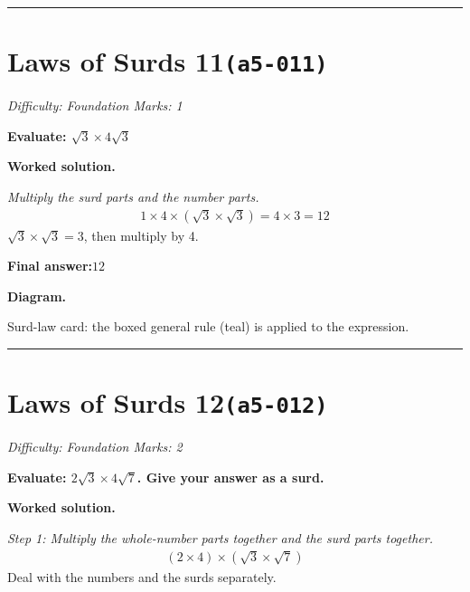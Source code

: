 \documentclass[11pt]{article}
\newcommand{\question}[1]{\par\medskip\noindent\textbf{#1}\par}
\begin{document}
\medskip\hrule

\section*{Laws of Surds 11\quad\small\texttt{(a5-011)}}
\textit{Difficulty: Foundation \quad\textbar\quad Marks: 1}

\question{Evaluate: \( \sqrt{3} \times 4\sqrt{3} \)}

\textbf{Worked solution.}

\textit{Multiply the surd parts and the number parts.}
\[\begin{gathered}
1 \times 4 \times (\sqrt{3} \times \sqrt{3}) = 4 \times 3 = 12
\end{gathered}\]
\( \sqrt{3} \times \sqrt{3} = 3 \), then multiply by 4.

\begin{answerbox}
\textbf{Final answer:}\quad \(\displaystyle 12\)
\end{answerbox}
\textbf{Diagram.}

\begin{center}
\end{center}
\small Surd-law card: the boxed general rule (teal) is applied to the expression.\normalsize

\medskip\hrule

\section*{Laws of Surds 12\quad\small\texttt{(a5-012)}}
\textit{Difficulty: Foundation \quad\textbar\quad Marks: 2}

\question{Evaluate: \( 2\sqrt{3} \times 4\sqrt{7} \). Give your answer as a surd.}

\textbf{Worked solution.}

\textit{Step 1: Multiply the whole-number parts together and the surd parts together.}
\[\begin{gathered}
(2 \times 4) \times (\sqrt{3} \times \sqrt{7})
\end{gathered}\]
Deal with the numbers and the surds separately.
\end{document}
